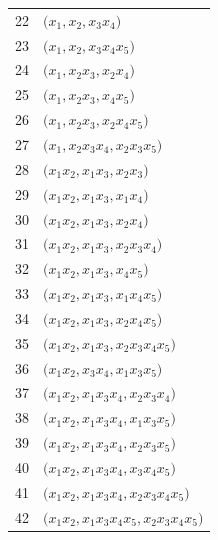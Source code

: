 {\begin{longtable}{@{}r>{\raggedright\arraybackslash}p{}@{}}
22 & \(\bigl(x_{1},\allowbreak x_{2},\allowbreak x_{3}x_{4}\bigr)\) \\
23 & \(\bigl(x_{1},\allowbreak x_{2},\allowbreak x_{3}x_{4}x_{5}\bigr)\) \\
24 & \(\bigl(x_{1},\allowbreak x_{2}x_{3},\allowbreak x_{2}x_{4}\bigr)\) \\
25 & \(\bigl(x_{1},\allowbreak x_{2}x_{3},\allowbreak x_{4}x_{5}\bigr)\) \\
26 & \(\bigl(x_{1},\allowbreak x_{2}x_{3},\allowbreak x_{2}x_{4}x_{5}\bigr)\) \\
27 & \(\bigl(x_{1},\allowbreak x_{2}x_{3}x_{4},\allowbreak x_{2}x_{3}x_{5}\bigr)\) \\
28 & \(\bigl(x_{1}x_{2},\allowbreak x_{1}x_{3},\allowbreak x_{2}x_{3}\bigr)\) \\
29 & \(\bigl(x_{1}x_{2},\allowbreak x_{1}x_{3},\allowbreak x_{1}x_{4}\bigr)\) \\
30 & \(\bigl(x_{1}x_{2},\allowbreak x_{1}x_{3},\allowbreak x_{2}x_{4}\bigr)\) \\
31 & \(\bigl(x_{1}x_{2},\allowbreak x_{1}x_{3},\allowbreak x_{2}x_{3}x_{4}\bigr)\) \\
32 & \(\bigl(x_{1}x_{2},\allowbreak x_{1}x_{3},\allowbreak x_{4}x_{5}\bigr)\) \\
33 & \(\bigl(x_{1}x_{2},\allowbreak x_{1}x_{3},\allowbreak x_{1}x_{4}x_{5}\bigr)\) \\
34 & \(\bigl(x_{1}x_{2},\allowbreak x_{1}x_{3},\allowbreak x_{2}x_{4}x_{5}\bigr)\) \\
35 & \(\bigl(x_{1}x_{2},\allowbreak x_{1}x_{3},\allowbreak x_{2}x_{3}x_{4}x_{5}\bigr)\) \\
36 & \(\bigl(x_{1}x_{2},\allowbreak x_{3}x_{4},\allowbreak x_{1}x_{3}x_{5}\bigr)\) \\
37 & \(\bigl(x_{1}x_{2},\allowbreak x_{1}x_{3}x_{4},\allowbreak x_{2}x_{3}x_{4}\bigr)\) \\
38 & \(\bigl(x_{1}x_{2},\allowbreak x_{1}x_{3}x_{4},\allowbreak x_{1}x_{3}x_{5}\bigr)\) \\
39 & \(\bigl(x_{1}x_{2},\allowbreak x_{1}x_{3}x_{4},\allowbreak x_{2}x_{3}x_{5}\bigr)\) \\
40 & \(\bigl(x_{1}x_{2},\allowbreak x_{1}x_{3}x_{4},\allowbreak x_{3}x_{4}x_{5}\bigr)\) \\
41 & \(\bigl(x_{1}x_{2},\allowbreak x_{1}x_{3}x_{4},\allowbreak x_{2}x_{3}x_{4}x_{5}\bigr)\) \\
42 & \(\bigl(x_{1}x_{2},\allowbreak x_{1}x_{3}x_{4}x_{5},\allowbreak x_{2}x_{3}x_{4}x_{5}\bigr)\) \\

\end{longtable}}
